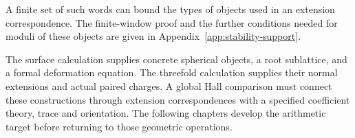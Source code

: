 A finite set of such words can bound the types of objects used in an
extension correspondence.  The finite-window proof and the further
conditions needed for moduli of these objects are given in
Appendix~\ref{app:stability-support}.

The surface calculation supplies concrete spherical objects, a root
sublattice, and a formal deformation equation.  The threefold
calculation supplies their normal extensions and actual paired
charges.  A global Hall comparison must connect these constructions
through extension correspondences with a specified coefficient
theory, trace and orientation.  The following chapters develop the
arithmetic target before returning to those geometric operations.
